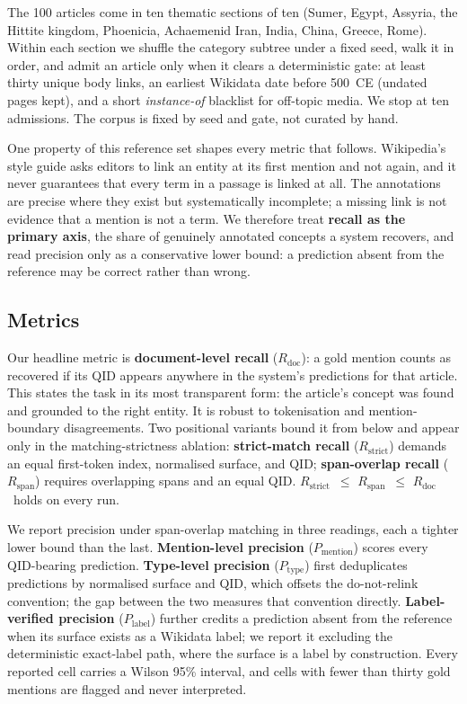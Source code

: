 \documentclass[sigconf,review]{acmart}
\newcommand{\Rdoc}{\ensuremath{R_{\mathrm{doc}}}}
\newcommand{\Rspan}{\ensuremath{R_{\mathrm{span}}}}
\newcommand{\Rstrict}{\ensuremath{R_{\mathrm{strict}}}}
\newcommand{\Pmention}{\ensuremath{P_{\mathrm{mention}}}}
\newcommand{\Ptype}{\ensuremath{P_{\mathrm{type}}}}
\newcommand{\Plabel}{\ensuremath{P_{\mathrm{label}}}}
\begin{document}
The 100 articles come in ten thematic sections of ten (Sumer, Egypt, Assyria,
the Hittite kingdom, Phoenicia, Achaemenid Iran, India, China, Greece, Rome).
Within each section we shuffle the category subtree under a fixed seed, walk it
in order, and admit an article only when it clears a deterministic gate: at
least thirty unique body links, an earliest Wikidata date before 500~CE
(undated pages kept), and a short \emph{instance-of} blacklist for off-topic
media. We stop at ten admissions. The corpus is fixed by seed and gate, not
curated by hand.

One property of this reference set shapes every metric that follows.
Wikipedia's style guide asks editors to link an entity at its first mention and
not again, and it never guarantees that every term in a passage is linked at
all. The annotations are precise where they exist but systematically
incomplete; a missing link is not evidence that a mention is not a term. We
therefore treat \textbf{recall as the primary axis}, the share of genuinely
annotated concepts a system recovers, and read precision only as a conservative
lower bound: a prediction absent from the reference may be correct rather than
wrong.

\subsection{Metrics}
\label{sec:metrics}

Our headline metric is \textbf{document-level recall} (\Rdoc): a gold mention
counts as recovered if its QID appears anywhere in the system's predictions
for that article. This states the task in its most transparent form: the
article's concept was found and grounded to the right entity. It is robust to
tokenisation and mention-boundary disagreements. Two positional variants bound
it from below and appear only in the matching-strictness ablation:
\textbf{strict-match recall} (\Rstrict) demands an equal first-token index,
normalised surface, and QID; \textbf{span-overlap recall} (\Rspan) requires
overlapping spans and an equal QID. \Rstrict\ $\le$ \Rspan\ $\le$ \Rdoc\ holds
on every run.

We report precision under span-overlap matching in three readings, each a
tighter lower bound than the last. \textbf{Mention-level precision}
(\Pmention) scores every QID-bearing prediction. \textbf{Type-level precision}
(\Ptype) first deduplicates predictions by normalised surface and QID, which
offsets the do-not-relink convention; the gap between the two measures that
convention directly. \textbf{Label-verified precision} (\Plabel) further
credits a prediction absent from the reference when its surface exists as a
Wikidata label; we report it excluding the deterministic exact-label path,
where the surface is a label by construction. Every reported cell carries a
Wilson 95\% interval, and cells with fewer than thirty gold mentions are
flagged and never interpreted.
\end{document}
